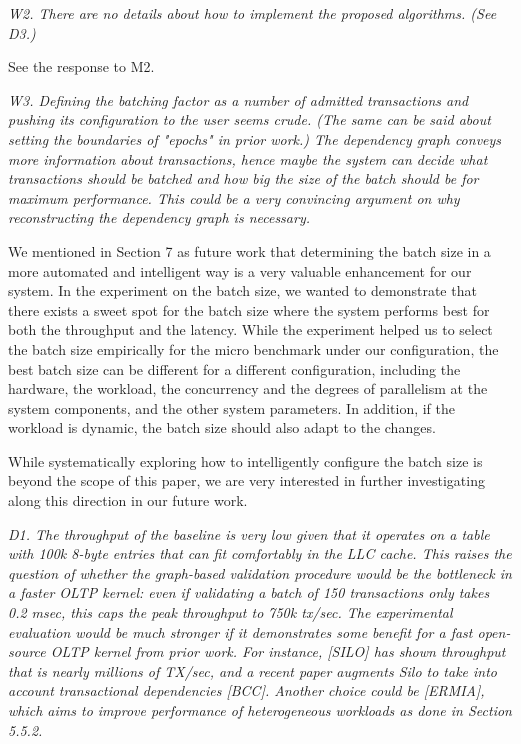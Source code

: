 \documentclass{article}
\begin{document}
\emph{W2. There are no details about how to implement the proposed algorithms. (See D3.)}

\bigskip
See the response to M2.

\bigskip

\emph{W3. Defining the batching factor as a number of admitted transactions and pushing its configuration to the user seems crude. (The same can be said about setting the boundaries of "epochs" in prior work.) The dependency graph conveys more information about transactions, hence maybe the system can decide what transactions should be batched and how big the size of the batch should be for maximum performance. This could be a very convincing argument on why reconstructing the dependency graph is necessary.}

\bigskip
We mentioned in Section 7 as future work that determining the batch size in a more automated and intelligent way is a very valuable enhancement for our system. In the experiment on the batch size, we wanted to demonstrate that there exists a sweet spot for the batch size where the system performs best for both the throughput and the latency. While the experiment helped us to select the batch size empirically for the micro benchmark under our configuration, the best batch size can be different for a different configuration, including the hardware, the workload, the concurrency and the degrees of parallelism at the system components, and the other system parameters. In addition, if the workload is dynamic, the batch size should also adapt to the changes.

While systematically exploring how to intelligently configure the batch size is beyond the scope of this paper, we are very interested in further investigating along this direction in our future work.
\bigskip

\emph{D1. The throughput of the baseline is very low given that it operates on a table with 100k 8-byte entries that can fit comfortably in the LLC cache. This raises the question of whether the graph-based validation procedure would be the bottleneck in a faster OLTP kernel: even if validating a batch of 150 transactions only takes 0.2 msec, this caps the peak throughput to 750k tx/sec. The experimental evaluation would be much stronger if it demonstrates some benefit for a fast open-source OLTP kernel from prior work. For instance, [SILO] has shown throughput that is nearly millions of TX/sec, and a recent paper augments Silo to take into account transactional dependencies [BCC]. Another choice could be [ERMIA], which aims to improve performance of heterogeneous workloads as done in Section 5.5.2.}
\end{document}
